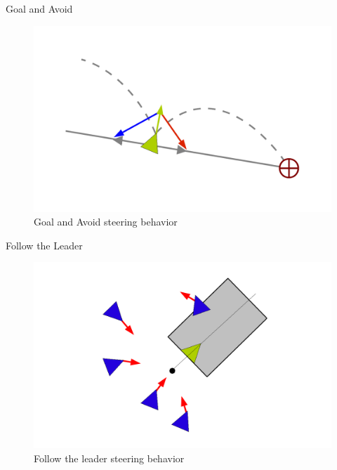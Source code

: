 \documentclass[red]{beamer}
\begin{document}
\begin{frame}{Goal and Avoid}
	\pause
	\begin{figure}[htbp]
	\begin{center}
	\includegraphics[scale=0.35]{../figures/seekANDflee.pdf}
	\caption{Goal and Avoid steering behavior}
	\label{seekANDflee}
	\end{center}
	\end{figure}
\end{frame}

\begin{frame}{Follow the Leader}
	\pause
	\begin{figure}[htbp]
	\begin{center}
	\includegraphics[scale=0.35]{../figures/leaderFollowing.pdf}
	\caption{Follow the leader steering behavior}
	\label{leadFollow}
	\end{center}
	\end{figure}
\end{frame}
\end{document}
